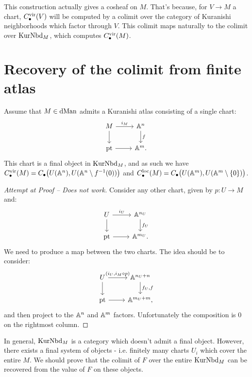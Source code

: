 \begin{rem}
This construction actually gives a cosheaf on $M$. That's because, for $V \to M$ a chart, $C_{\bullet}^{\operatorname{vir}}(V)$ will be computed
by a colimit over the category of Kuranishi neighborhoods which factor through $V$. This colimit maps naturally to the
colimit over $\operatorname{KurNbd}_M$, which computes $C_{\bullet}^{\operatorname{vir}}(M)$.
\end{rem}


\section{Recovery of the colimit from finite atlas}
\begin{conj}
Assume that $M \in \operatorname{dMan}$ admits a Kuranishi atlas consisting of a single chart:
\[
\begin{tikzcd}
M\arrow{r}{i_M}\arrow{d} & \bbA^n\arrow{d}{f} \\ \pt \arrow{r} & \bbA^m .
\end{tikzcd}
\]
This chart is a final object in $\operatorname{KurNbd}_M$, and as such we have $C^{\operatorname{vir}}_{\bullet}(M) = C_{\bullet}\big(U(\mathbb A^n), 
U(\mathbb A^n \setminus f^{-1}(0)) \big)$ and $C^{\operatorname{loc}}_{\bullet}(M) = C_{\bullet}\big(U(\mathbb A^m), 
U(\mathbb A^m \setminus \{0\}) \big)$.
\end{conj}
\begin{proof}[Attempt at Proof -- Does not work]
Consider any other chart, given by $p: U \to M$ and:
\[
\begin{tikzcd}
U\arrow{r}{i_U}\arrow{d} & \bbA^{n_U}\arrow{d}{f_U} \\ \pt \arrow{r} & \bbA^{m_U} .
\end{tikzcd}
\]
We need to produce a map between the two charts. The idea should be to consider:
\[
\begin{tikzcd}
U\arrow{r}{(i_U,i_M \circ p)}\arrow{d} & \bbA^{n_U+n}\arrow{d}{f_U,f} \\ \pt \arrow{r} & \bbA^{m_U+m} ,
\end{tikzcd}
\]
and then project to the $\mathbb A^n$ and $\mathbb A^m$ factors. Unfortunately the composition is 0 on the rightmost column.
\end{proof}

In general, $\operatorname{KurNbd}_M$ is a category which doesn't admit a final object. However, there exists a final system of objects
 - i.e. finitely many charts $U_i$ which cover the entire $M$. We should prove that the colimit of $F$ over the entire $\operatorname{KurNbd}_M$
can be recovered from the value of $F$ on these objects.




